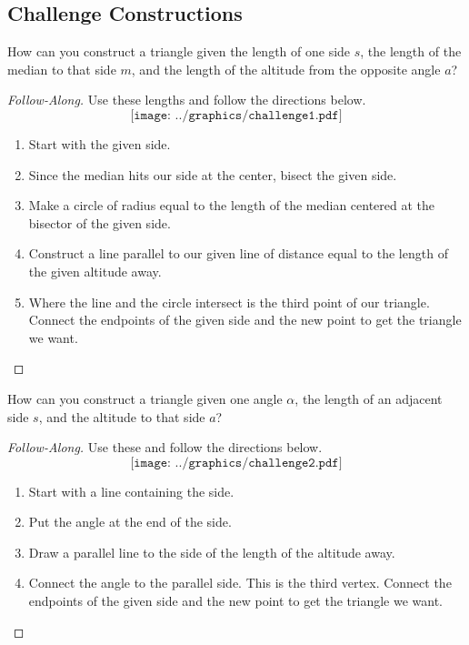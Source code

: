 \subsection{Challenge Constructions}

\begin{question} 
How can you construct a triangle given the length of one side $s$, the
length of the median to that side $m$, and the length of the
altitude from the opposite angle $a$?
\end{question}

\begin{proof}[Follow-Along] 
Use these lengths and follow the directions below.
\[
\texttt{[image: ../graphics/challenge1.pdf]}
\]
\begin{enumerate}
\item Start with the given side.
\item Since the median hits our side at the center, bisect the given
  side.
\item Make a circle of radius equal to the length of the median
  centered at the bisector of the given side.
\item Construct a line parallel to our given line of distance equal to
  the length of the given altitude away.
\item Where the line and the circle intersect is the third point of
  our triangle. Connect the endpoints of the given side and the new
  point to get the triangle we want.
\end{enumerate}
\end{proof}


\begin{question} How can you construct a triangle given one angle $\alpha$, the 
length of an adjacent side $s$, and the altitude to that side $a$?
\end{question}

\begin{proof}[Follow-Along]
Use these and follow the directions below.
\[
\texttt{[image: ../graphics/challenge2.pdf]}
\]
\begin{enumerate}
\item Start with a line containing the side.
\item Put the angle at the end of the side.
\item Draw a parallel line to the side of the length of the altitude
  away.
\item Connect the angle to the parallel side. This is the third
  vertex. Connect the endpoints of the given side and the new point to
  get the triangle we want.
\end{enumerate}
\end{proof}


